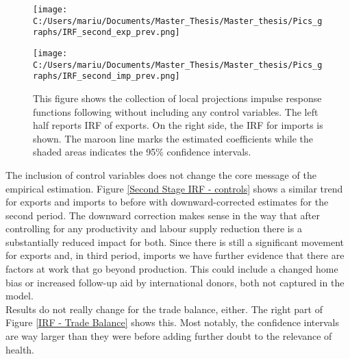 \documentclass{article}
\begin{document}
\begin{figure}[!ht]
\begin{center}
\begin{minipage}[t]{0.9\textwidth}
\begin{minipage}[t]{0.5\linewidth}\vspace{0pt} 
\texttt{[image: C:/Users/mariu/Documents/Master\_Thesis/Master\_thesis/Pics\_graphs/IRF\_second\_exp\_prev.png]}\\
\end{minipage}\hfill%
\begin{minipage}[t]{0.5\linewidth}\vspace{0pt} 
\texttt{[image: C:/Users/mariu/Documents/Master\_Thesis/Master\_thesis/Pics\_graphs/IRF\_second\_imp\_prev.png]}\\
\end{minipage}\hfill%
\caption{This figure shows the collection of local projections impulse response functions following \cite{jorda2005estimation} without including any control variables. The left half reports IRF of exports. On the right side, the IRF for imports is shown. The maroon line marks the estimated coefficients while the shaded areas indicates the 95\% confidence intervals.}
\label{Second Stage IRF - no controls}
\end{minipage}
\end{center}
\end{figure}

The inclusion of control variables does not change the core message of the empirical estimation. Figure \ref{Second Stage IRF - controls} shows a similar trend for exports and imports to before with downward-corrected estimates for the second period. The downward correction makes sense in the way that after controlling for any productivity and labour supply reduction there is a substantially reduced impact for both. Since there is still a significant movement for exports and, in third period, imports we have further evidence that there are factors at work that go beyond production. This could include a changed home bias or increased follow-up aid by international donors, both not captured in the model.\\
Results do not really change for the trade balance, either. The right part of Figure \ref{IRF - Trade Balance} shows this. Most notably, the confidence intervals are way larger than they were before adding further doubt to the relevance of health.
\end{document}
